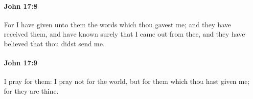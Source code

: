		\paragraph{John 17:8} %
			\label{JOHN-17-8}

			For I have given unto them the words which thou gavest me; and they have received them, and have known surely that I came out from thee, and they have believed that thou didst send me.

			\begin{framed}
				\scriptsize
				\begin{compactdesc}
					\item[SBLG] 
				\end{compactdesc}
			\end{framed}

		\paragraph{John 17:9} %
			\label{JOHN-17-9}

			I pray for them: I pray not for the world, but for them which thou hast given me; for they are thine.

